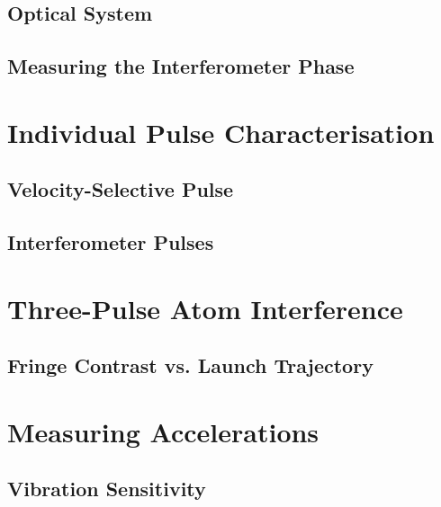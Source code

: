 \subsection{Optical System}\label{subsec:photodiode_setup}
\subsection{Measuring the Interferometer Phase}\label{subsec:phase_measurement}

\section{Individual Pulse Characterisation} \label{sec:atomint_rabiosc}
\subsection{Velocity-Selective Pulse}
\subsection{Interferometer Pulses}

\section{Three-Pulse Atom Interference} \label{sec:atomint_threepulse}
\subsection{Fringe Contrast vs. Launch Trajectory}\label{subsec:launch_contrast}
\section{Measuring Accelerations}\label{sec:atomint_accelerations}
\subsection{Vibration Sensitivity}
